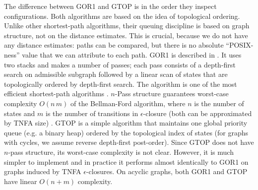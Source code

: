 \documentclass[AMA,STIX1COL]{WileyNJD-v2}
\begin{document}
The difference between GOR1 and GTOP is in the order they inspect configurations.
%
Both algorithms are based on the idea of topological ordering.
Unlike other shortest-path algorithms, their queuing discipline is based on graph structure, not on the distance estimates.
This is crucial, because we do not have any distance estimates:
paths can be compared, but there is no absolute ``POSIX-ness'' value that we can attribute to each path.
%
GOR1 is described in \cite{GR93}.
It uses two stacks and makes a number of passes;
each pass consists of a depth-first search on admissible subgraph
followed by a linear scan of states that are topologically ordered by depth-first search.
The algorithm is one of the most efficient shortest-path algorithms \cite{CGR96}.
$n$-Pass structure guarantees worst-case complexity $O(n \, m)$ of the Bellman-Ford algorithm,
where $n$ is the number of states and $m$ is the number of transitions in $\epsilon$-closure
(both can be approximated by TNFA size) \cite{CGGTW09}.
%
GTOP is a simple algorithm that maintains one global priority queue (e.g. a binary heap)
ordered by the topological index of states (for graphs with cycles, we assume reverse depth-first post-order).
Since GTOP does not have $n$-pass structure, its worst-case complexity is not clear.
However, it is much simpler to implement
and in practice it performs almost identically to GOR1 on graphs induced by TNFA $\epsilon$-closures.
%
On acyclic graphs, both GOR1 and GTOP have linear $O(n + m)$ complexity.
\\
\end{document}
